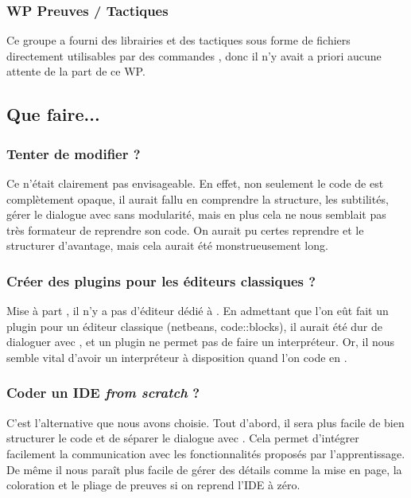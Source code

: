 \subsubsection{WP Preuves / Tactiques}
Ce groupe a fourni des librairies et des tactiques sous forme de fichiers \Coq{} directement utilisables par des commandes \Coq{}, donc il n'y avait a priori aucune attente de la part de ce WP.

\subsection{Que faire...}

\subsubsection{Tenter de modifier \CoqIde{} ?}

Ce n'était clairement pas envisageable. En effet, non seulement le code de \CoqIde{} est complètement opaque, il aurait fallu en comprendre la structure, les subtilités, gérer le dialogue avec \Coq{} sans modularité, mais en plus cela ne nous semblait pas très formateur de reprendre son code. On aurait pu certes reprendre \CoqIde{} et le structurer d'avantage, mais cela aurait été monstrueusement long.

\subsubsection{Créer des plugins pour les éditeurs classiques ?}

Mise à part \CoqIde, il n'y a pas d'éditeur dédié à \Coq{}. En admettant que l'on eût fait un plugin pour un éditeur classique (netbeans, code::blocks), il aurait été dur de dialoguer avec \coqtop{}, et un plugin ne permet pas de faire un interpréteur. Or, il nous semble vital d'avoir un interpréteur à disposition quand l'on code en \Coq{}.

\subsubsection{Coder un IDE \emph{from scratch} ?}

C'est l'alternative que nous avons choisie.
Tout d'abord, il sera plus facile de bien structurer le code et de séparer le dialogue avec \Coq{}. 
Cela permet d'intégrer facilement la communication avec les fonctionnalités proposés par l'apprentissage.
De même il nous paraît plus facile de gérer des détails comme la mise en page, la coloration et le pliage de preuves si on reprend l'IDE à zéro.

